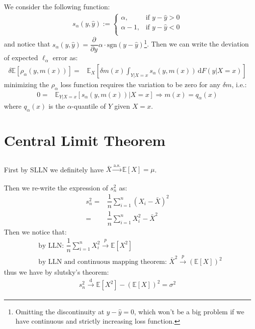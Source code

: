 \documentclass[11pt,a4paper]{ctexart}
\numberwithin{equation}{section}%
\begin{document}
\subsection{}

We consider the following function:
\begin{align*}
    s_\alpha (y,\hat{y}):=\begin{cases}
        \alpha , & \text{if } y-\hat{y}>0\\
        \alpha -1, & \text{if } y-\hat{y}<0\\
    \end{cases} 
\end{align*}
and notice that $ s_\alpha (y,\hat{y}) = \dfrac{\partial^{}  }{\partial y^{} }\alpha \cdot \mathrm{ sgn }(y-\hat{y}) $\footnote{Omitting the discontinuity at $ y-\hat{y}=0 $, which won't be a big problem if we have continuous and strictly increasing loss function.}. Then we can write the deviation of expected $ \ell_\alpha  $ error as:
\begin{align*}
    \delta \mathbb{E}\left[ \rho _\alpha (y,m(x)) \right] =& \mathbb{E}_X\left[ \delta m(x) \int_{Y|X=x} s_\alpha (y,m(x)) \,\mathrm{d}F(y|X=x) \right] 
\end{align*}
minimizing the $ \rho _\alpha  $ loss function requires the variation to be zero for any $ \delta m $, i.e.:
\begin{align*}
    0=& \mathbb{E}_{Y|X=x}\left[  s_\alpha (y,m(x)) |X=x \right]  \Rightarrow m(x) = q_\alpha (x)
\end{align*}
where $ q_\alpha (x) $ is the $ \alpha  $-quantile of $ Y $ given $ X=x $.


\section{Central Limit Theorem}

\subsection{}

First by SLLN we definitely have $ \bar{X}\xrightarrow[]{\mathrm{a.s.}} \mathbb{E}\left[ X \right] =\mu   $.

Then we re-write the expression of $ s_n^2 $ as:
\begin{align*}
    s_n^2=& \dfrac{ 1 }{ n }\sum_{i=1}^n (X_i-\bar{X})^2 \\
    =& \dfrac{ 1 }{ n }\sum_{i=1}^n  X_i^2 - \bar{X}^2 
\end{align*}
Then we notice that:
\begin{align*}
    &\text{by LLN: }\dfrac{ 1 }{ n }\sum_{i=1}^n X_i^2 \xrightarrow{p} \mathbb{E}\left[ X^2 \right]\\
    &\text{by LLN and continuous mapping theorem: }\bar{X}^2 \xrightarrow{p} \left( \mathbb{E}\left[ X \right] \right)^2
\end{align*}
thus we have by slutsky's theorem:
\begin{align*}
     s_n^2 \xrightarrow[]{\mathrm{d}} \mathbb{E}\left[ X^2 \right] - \left( \mathbb{E}\left[ X \right] \right)^2 = \sigma ^2
\end{align*}
\end{document}
